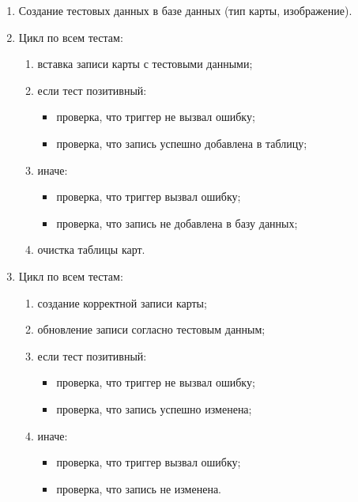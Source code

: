 \begin{enumerate}
	\item Создание тестовых данных в базе данных (тип карты, изображение).
	\item Цикл по всем тестам:
	      \begin{enumerate}
		      \item вставка записи карты с тестовыми данными;
		      \item если тест позитивный:
		            \begin{itemize}
			            \item проверка, что триггер не вызвал
			                  ошибку;
			            \item проверка, что запись успешно
			                  добавлена в таблицу;
		            \end{itemize}
		      \item иначе:
		            \begin{itemize}
			            \item проверка, что триггер вызвал ошибку;
			            \item проверка, что запись не добавлена в
			                  базу данных;
		            \end{itemize}
		      \item очистка таблицы карт.
	      \end{enumerate}
	\item Цикл по всем тестам:
	      \begin{enumerate}
		      \item создание корректной записи карты;
		      \item обновление записи согласно тестовым данным;
		      \item если тест позитивный:
		            \begin{itemize}
			            \item проверка, что триггер не вызвал
			                  ошибку;
			            \item проверка, что запись успешно
			                  изменена;
		            \end{itemize}
		      \item иначе:
		            \begin{itemize}
			            \item проверка, что триггер вызвал ошибку;
			            \item проверка, что запись не изменена.
		            \end{itemize}
	      \end{enumerate}
\end{enumerate}

